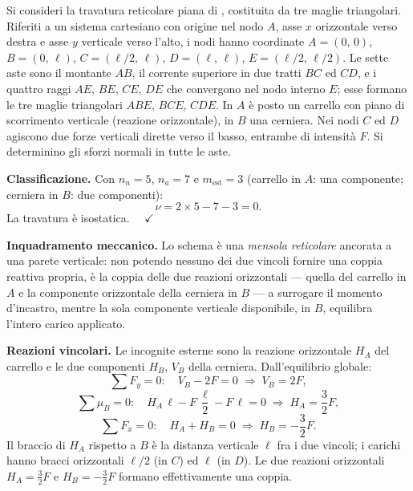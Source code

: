 \begin{esercizio}
	\label{ex:mensola}
	
Si consideri la travatura reticolare piana di
, costituita da tre maglie
triangolari. Riferiti a un sistema cartesiano con
origine nel nodo $A$, asse $x$ orizzontale verso destra
e asse $y$ verticale verso l'alto, i nodi hanno
coordinate $A=(0,\,0)$,
$B=(0,\,\ell)$, $C=(\ell/2,\,\ell)$, $D=(\ell,\,\ell)$,
$E=(\ell/2,\,\ell/2)$. Le sette aste sono il montante
$AB$, il corrente superiore in due tratti $BC$ ed $CD$,
e i quattro raggi $AE$, $BE$, $CE$, $DE$ che convergono
nel nodo interno $E$; esse formano le tre maglie
triangolari $ABE$, $BCE$, $CDE$. In $A$ è posto un
carrello con piano di scorrimento verticale (reazione
orizzontale), in $B$ una cerniera. Nei nodi $C$ ed $D$
agiscono due forze verticali dirette verso il basso,
entrambe di intensità $F$. Si determinino gli sforzi
normali in tutte le aste.
	
	
	\begin{svolgimento}
		



		
		\noindent\textbf{Classificazione.}
		Con $n_n = 5$, $n_a = 7$ e $m_\text{est} = 3$
		(carrello in $A$: una componente; cerniera in $B$:
		due componenti):
		\[
		\nu = 2\times 5 - 7 - 3 = 0.
		\]
		La travatura è isostatica. $\quad\checkmark$
		
		\noindent\textbf{Inquadramento meccanico.}
		Lo schema è una \emph{mensola reticolare} ancorata a
		una parete verticale: non potendo nessuno dei due
		vincoli fornire una coppia reattiva propria, è la
		coppia delle due reazioni orizzontali --- quella del
		carrello in $A$ e la componente orizzontale della
		cerniera in $B$ --- a surrogare il momento d'incastro,
		mentre la sola componente verticale disponibile,
		in $B$, equilibra l'intero carico applicato.
		
		\noindent\textbf{Reazioni vincolari.}
		Le incognite esterne sono la reazione orizzontale
		$H_A$ del carrello e le due componenti $H_B$, $V_B$
		della cerniera. Dall'equilibrio globale:
		\[
		\sum F_y = 0:\quad
		V_B - 2F = 0
		\;\Rightarrow\;
		V_B = 2F,
		\]
		\[
		\sum \mu_B = 0:\quad
		H_A\,\ell - F\,\frac{\ell}{2} - F\,\ell = 0
		\;\Rightarrow\;
		H_A = \frac{3}{2}F,
		\]
		\[
		\sum F_x = 0:\quad
		H_A + H_B = 0
		\;\Rightarrow\;
		H_B = -\frac{3}{2}F.
		\]
		Il braccio di $H_A$ rispetto a $B$ è la distanza
		verticale $\ell$ fra i due vincoli; i carichi hanno
		bracci orizzontali $\ell/2$ (in $C$) ed $\ell$ (in
		$D$). Le due reazioni orizzontali $H_A=\tfrac32 F$ e
		$H_B=-\tfrac32 F$ formano effettivamente una coppia.
		

\end{svolgimento}
\end{esercizio}
